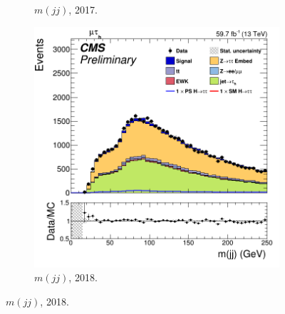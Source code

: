 \begin{figure}
\begin{subfigure}[b]{0.33\linewidth}
    \caption{$m(jj)$, 2017.} 
    \vspace{0.5ex}
  \end{subfigure} 
    \begin{subfigure}[b]{0.33\linewidth}
    \centering
    \includegraphics[width=\linewidth]{Chapitre7/Images/CtrlPlots/2018/DijetMass.png} 
    \caption{$m(jj)$, 2018.} 
    \vspace{0.5ex}
  \end{subfigure} 


\end{figure}
